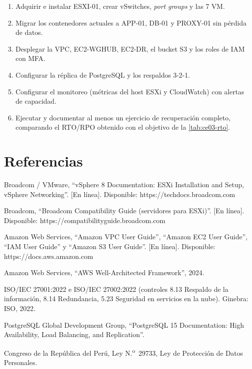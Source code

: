\begin{enumerate}
  \item Adquirir e instalar ESXI-01, crear vSwitches, \emph{port groups} y las 7 VM.
  \item Migrar los contenedores actuales a APP-01, DB-01 y PROXY-01 sin pérdida de datos.
  \item Desplegar la VPC, EC2-WGHUB, EC2-DR, el bucket S3 y los roles de IAM con MFA.
  \item Configurar la réplica de PostgreSQL y los respaldos 3-2-1.
  \item Configurar el monitoreo (métricas del host ESXi y CloudWatch) con alertas de capacidad.
  \item Ejecutar y documentar al menos un ejercicio de recuperación completo, comparando
  el RTO/RPO obtenido con el objetivo de la \cref{tab:ce03-rto}.
\end{enumerate}

\section*{Referencias}
{\small
\begin{enumerate}[label={[\arabic*]},leftmargin=2em]
  \item Broadcom / VMware, ``vSphere 8 Documentation: ESXi Installation and Setup, vSphere Networking''. [En línea]. Disponible: https://techdocs.broadcom.com
  \item Broadcom, ``Broadcom Compatibility Guide (servidores para ESXi)''. [En línea]. Disponible: https://compatibilityguide.broadcom.com
  \item Amazon Web Services, ``Amazon VPC User Guide'', ``Amazon EC2 User Guide'', ``IAM User Guide'' y ``Amazon S3 User Guide''. [En línea]. Disponible: https://docs.aws.amazon.com
  \item Amazon Web Services, ``AWS Well-Architected Framework'', 2024.
  \item ISO/IEC 27001:2022 e ISO/IEC 27002:2022 (controles 8.13 Respaldo de la información, 8.14 Redundancia, 5.23 Seguridad en servicios en la nube). Ginebra: ISO, 2022.
  \item PostgreSQL Global Development Group, ``PostgreSQL 15 Documentation: High Availability, Load Balancing, and Replication''.
  \item Congreso de la República del Perú, Ley N.\textsuperscript{o}~29733, Ley de Protección de Datos Personales.
\end{enumerate}
}
